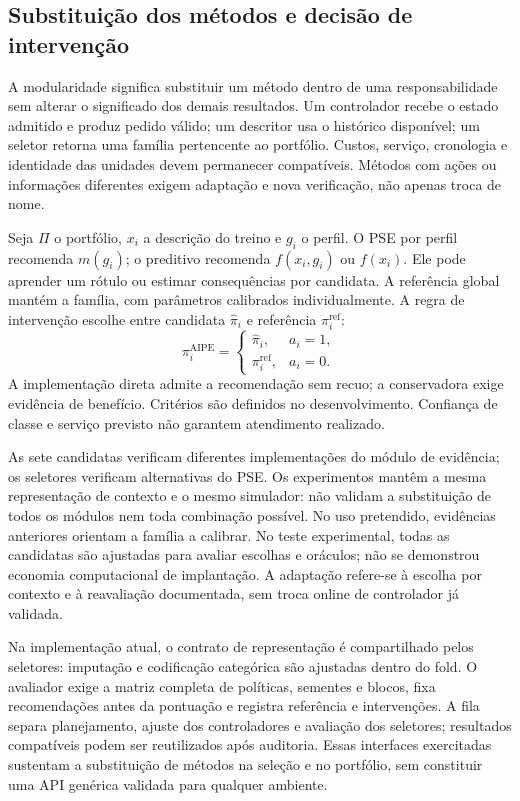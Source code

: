 \documentclass[preprint,12pt]{elsarticle}
\begin{document}
\subsection{Substituição dos métodos e decisão de intervenção}
A modularidade significa substituir um método dentro de uma responsabilidade sem alterar o significado dos demais resultados. Um controlador recebe o estado admitido e produz pedido válido; um descritor usa o histórico disponível; um seletor retorna uma família pertencente ao portfólio. Custos, serviço, cronologia e identidade das unidades devem permanecer compatíveis. Métodos com ações ou informações diferentes exigem adaptação e nova verificação, não apenas troca de nome.

Seja $\Pi$ o portfólio, $x_i$ a descrição do treino e $g_i$ o perfil. O PSE por perfil recomenda $m(g_i)$; o preditivo recomenda $f(x_i,g_i)$ ou $f(x_i)$. Ele pode aprender um rótulo ou estimar consequências por candidata. A referência global mantém a família, com parâmetros calibrados individualmente. A regra de intervenção escolhe entre candidata $\widehat\pi_i$ e referência $\pi_i^{\mathrm{ref}}$:
\[
 \pi_i^{\mathrm{AIPE}}=
 \begin{cases}\widehat\pi_i,&a_i=1,\\\pi_i^{\mathrm{ref}},&a_i=0.\end{cases}
\]
A implementação direta admite a recomendação sem recuo; a conservadora exige evidência de benefício. Critérios são definidos no desenvolvimento. Confiança de classe e serviço previsto não garantem atendimento realizado.

As sete candidatas verificam diferentes implementações do módulo de evidência; os seletores verificam alternativas do PSE. Os experimentos mantêm a mesma representação de contexto e o mesmo simulador: não validam a substituição de todos os módulos nem toda combinação possível. No uso pretendido, evidências anteriores orientam a família a calibrar. No teste experimental, todas as candidatas são ajustadas para avaliar escolhas e oráculos; não se demonstrou economia computacional de implantação. A adaptação refere-se à escolha por contexto e à reavaliação documentada, sem troca online de controlador já validada.

Na implementação atual, o contrato de representação é compartilhado pelos seletores: imputação e codificação categórica são ajustadas dentro do fold. O avaliador exige a matriz completa de políticas, sementes e blocos, fixa recomendações antes da pontuação e registra referência e intervenções. A fila separa planejamento, ajuste dos controladores e avaliação dos seletores; resultados compatíveis podem ser reutilizados após auditoria. Essas interfaces exercitadas sustentam a substituição de métodos na seleção e no portfólio, sem constituir uma API genérica validada para qualquer ambiente.
\end{document}
